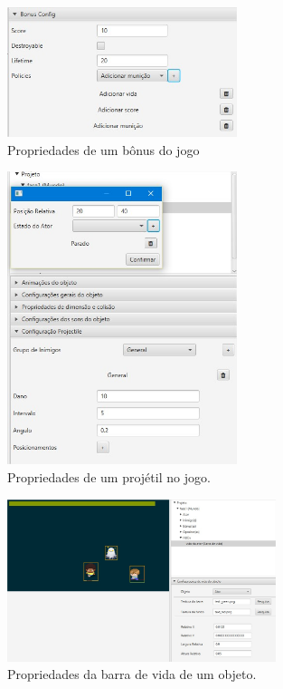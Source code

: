 \documentclass[12pt,oneside,openright,a4paper,english,brazil,sumario=tradicional]{abntex2}
\begin{document}
\begin{anexosenv}
   \begin{figure}[H]
   \centering
   \includegraphics[width=0.6\textwidth]{images/bonus_props.jpg}
   \caption{Propriedades de um bônus do jogo}
   \label{fig:bonus_props}
   \end{figure}

   \begin{figure}[H]
   \centering
   \includegraphics[width=0.6\textwidth]{images/projec_props.jpg}
   \caption{Propriedades de um projétil no jogo.}
   \label{fig:project_props}
   \end{figure}

   \begin{figure}[H]
   \centering
   \includegraphics[width=0.7\textwidth]{images/lifebar_props.jpg}
   \caption{Propriedades da barra de vida de um objeto.}
   \label{fig:lifebar_props}
   \end{figure}


\end{anexosenv}
\end{document}
